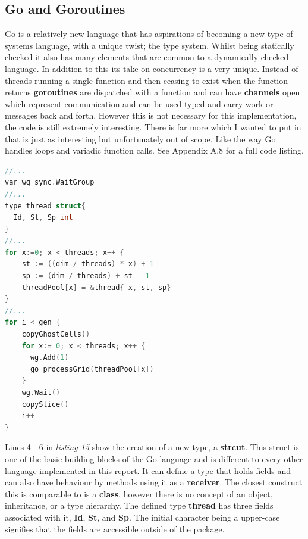 \documentclass[11pt]{article} %
\begin{document}
\subsection{Go and Goroutines}
Go is a relatively new language that has aspirations of becoming a new type of systems language, with a unique twist; the type system. Whilst being statically checked it also has many elements that are common to a dynamically checked language. In addition to this its take on concurrency is a very unique. Instead of threads running a single function and then ceasing to exist when the function returns {\bf goroutines} are dispatched with a function and can have {\bf channels} open which represent communication and can be used typed and carry work or messages back and forth. However this is not necessary for this implementation, the code is still extremely interesting. There is far more which I wanted to put in that is just as interesting but unfortunately out of scope. Like the way Go handles loops and variadic function calls. See Appendix A.8 for a full code listing.
\begin{lstlisting}[language=C, caption={Go and Goroutines, Game of Life Main Game Loop}]
//...
var wg sync.WaitGroup
//...
type thread struct{
  Id, St, Sp int
}
//...
for x:=0; x < threads; x++ {
    st := ((dim / threads) * x) + 1
    sp := (dim / threads) + st - 1
    threadPool[x] = &thread{ x, st, sp}
}
//...
for i < gen {
    copyGhostCells()
    for x:= 0; x < threads; x++ {
      wg.Add(1)
      go processGrid(threadPool[x])
    }
    wg.Wait()
    copySlice()
    i++
}  
\end{lstlisting}
Lines 4 - 6 in {\it listing 15} show the creation of a new type, a {\bf strcut}. This struct is one of the basic building blocks of the Go language and is different to every other language implemented in this report. It can define a type that holds fields and can also have behaviour by methods using it as a {\bf receiver}. The closest construct this is comparable to is a {\bf class}, however there is no concept of an object, inheritance, or a type hierarchy. The defined type {\bf thread} has three fields associated with it, {\bf Id}, {\bf St}, and {\bf Sp}. The initial character being a upper-case signifies that the fields are accessible outside of the package. 
\end{document}

